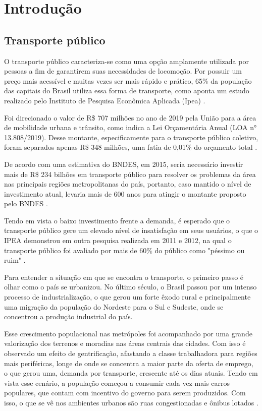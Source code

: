 \chapter{Introdução}
\label{Cap:Intro}


\section{Transporte público}
\indent
\par O transporte público caracteriza-se como uma opção amplamente utilizada por pessoas a fim de garantirem suas necessidades de locomoção. Por possuir um preço mais acessível e muitas vezes ser mais rápido e prático, 65\% da população das capitais do Brasil utiliza essa forma de transporte, como aponta um estudo realizado pelo Instituto de Pesquisa Econômica Aplicada (Ipea) \cite{Peduzzi2011}.

\par Foi direcionado o valor de R\$ 707 milhões no ano de 2019 pela União para a área de mobilidade urbana e trânsito, como indica a Lei Orçamentária Anual (LOA n° 13.808/2019). Desse montante, especificamente para o transporte público coletivo, foram separados apenas R\$ 348 milhões, uma fatia de 0,01\% do orçamento total \cite{NTUrbano}.
\par De acordo com uma estimativa do BNDES, em 2015, seria necessário investir mais de R\$ 234 bilhões em transporte público para resolver os problemas da área nas principais regiões metropolitanas do país, portanto, caso mantido o nível de investimento atual, levaria mais de 600 anos para atingir o montante proposto pelo BNDES \cite{Santos2015}.

\par Tendo em vista o baixo investimento frente a demanda, é esperado que o transporte público gere um elevado nível de insatisfação em seus usuários, o que o IPEA demonstrou em outra pesquisa realizada em 2011 e 2012, na qual o transporte público foi avaliado por mais de 60\% do público como "péssimo ou ruim"  \cite{Santos2015}.
\par Para entender a situação em que se encontra o transporte, o primeiro passo é olhar como o país se urbanizou. No último século, o Brasil passou por um intenso processo de industrialização, o que gerou um forte êxodo rural e principalmente uma migração da população do Nordeste para o Sul e Sudeste, onde se concentrou a produção industrial do país.
\par Esse crescimento populacional nas metrópoles foi acompanhado por uma grande valorização dos terrenos e moradias nas áreas centrais das cidades. Com isso é observado um efeito de gentrificação, afastando a classe trabalhadora para regiões mais periféricas, longe de onde se concentra a maior parte da oferta de emprego, o que gerou uma, demanda por transporte, crescente até os dias atuais.
Tendo em vista esse cenário, a população começou a consumir cada vez mais carros populares, que contam com incentivo do governo para serem produzidos. Com isso, o que se vê nos ambientes urbanos são ruas congestionadas e ônibus lotados \cite{PenaSD}.



